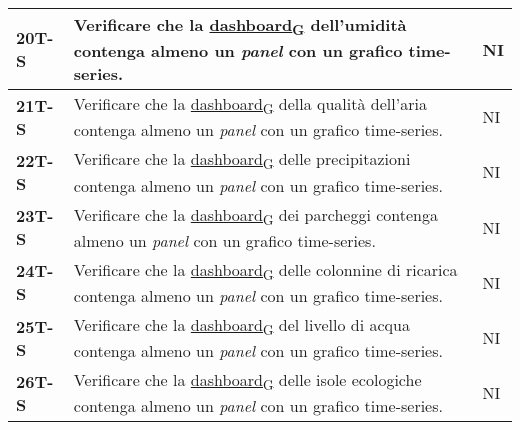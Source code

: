 \begin{longtable}{|>{\raggedright\arraybackslash}m{}|>{\raggedright\arraybackslash}m{}|>{\raggedright\arraybackslash}m{}|}
	\hline
	\textbf{20T-S}  & Verificare che la \href{https://7last.github.io/docs/rtb/documentazione-interna/glossario\#dashboard}{dashboard\textsubscript{G}} dell'umidità contenga almeno un \textit{panel} con un grafico time-series.                                                                                           & NI             \\
	\hline
	\textbf{21T-S}  & Verificare che la \href{https://7last.github.io/docs/rtb/documentazione-interna/glossario\#dashboard}{dashboard\textsubscript{G}} della qualità dell'aria contenga almeno un \textit{panel} con un grafico time-series.                                                                                & NI             \\
	\hline
	\textbf{22T-S}  & Verificare che la \href{https://7last.github.io/docs/rtb/documentazione-interna/glossario\#dashboard}{dashboard\textsubscript{G}} delle precipitazioni contenga almeno un \textit{panel} con un grafico time-series.                                                                                   & NI             \\
	\hline
	\textbf{23T-S}  & Verificare che la \href{https://7last.github.io/docs/rtb/documentazione-interna/glossario\#dashboard}{dashboard\textsubscript{G}} dei parcheggi contenga almeno un \textit{panel} con un grafico time-series.                                                                                          & NI             \\
	\hline
	\textbf{24T-S}  & Verificare che la \href{https://7last.github.io/docs/rtb/documentazione-interna/glossario\#dashboard}{dashboard\textsubscript{G}} delle colonnine di ricarica contenga almeno un \textit{panel} con un grafico time-series.                                                                            & NI             \\
	\hline
	\textbf{25T-S}  & Verificare che la \href{https://7last.github.io/docs/rtb/documentazione-interna/glossario\#dashboard}{dashboard\textsubscript{G}} del livello di acqua contenga almeno un \textit{panel} con un grafico time-series.                                                                                   & NI             \\
	\hline
	\textbf{26T-S}  & Verificare che la \href{https://7last.github.io/docs/rtb/documentazione-interna/glossario\#dashboard}{dashboard\textsubscript{G}} delle isole ecologiche contenga almeno un \textit{panel} con un grafico time-series.                                                                                 & NI             \\

\end{longtable}

